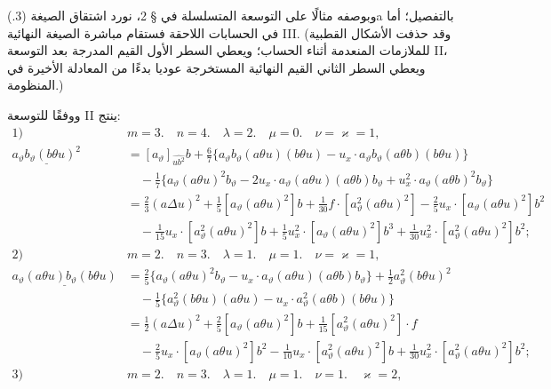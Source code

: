 \documentclass[11pt]{article}
\providecommand{\A}{\Delta}
\begin{document}
وبوصفه مثالًا على التوسعة المتسلسلة في § 2، نورد اشتقاق الصيغة (3.)a بالتفصيل؛ أما في الحسابات اللاحقة فستقام مباشرة الصيغة النهائية III. (وقد حذفت الأشكال القطبية للملازمات المنعدمة أثناء الحساب؛ ويعطي السطر الأول القيم المدرجة بعد التوسعة II، ويعطي السطر الثاني القيم النهائية المستخرجة عوديا بدءًا من المعادلة الأخيرة في المنظومة.)

ووفقًا للتوسعة II ينتج:
\[
\begin{aligned}
\text{1)}\quad&m=3.\quad n=4.\quad \lambda=2.\quad \mu=0.\quad \nu=\varkappa=1,\\[0.25em]
\underline{a_\vartheta b_\vartheta(b\theta u)^2}
&=[a_\vartheta]_{\widehat{ub^2}}b+\frac67\{a_\vartheta b_\vartheta(a\theta u)(b\theta u)-u_x\cdot a_\vartheta b_\vartheta(a\theta b)(b\theta u)\}\\
&\quad-\frac17\{a_\vartheta(a\theta u)^2b_\vartheta-2u_x\cdot a_\vartheta(a\theta u)(a\theta b)b_\vartheta+u_x^2\cdot a_\vartheta(a\theta b)^2b_\vartheta\}\\
&=\frac23(a\A u)^2+\frac15[a_\vartheta(a\theta u)^2]b+\frac1{30}f\cdot[a_\vartheta^2(a\theta u)^2]-\frac25u_x\cdot[a_\vartheta(a\theta u)^2]b^2\\
&\quad-\frac1{15}u_x\cdot[a_\vartheta^2(a\theta u)^2]b+\frac15u_x^2\cdot[a_\vartheta(a\theta u)^2]b^3+\frac1{30}u_x^2\cdot[a_\vartheta^2(a\theta u)^2]b^2;\\[0.7em]
\text{2)}\quad&m=2.\quad n=3.\quad \lambda=1.\quad \mu=1.\quad \nu=\varkappa=1,\\[0.25em]
\underline{a_\vartheta(a\theta u)b_\vartheta(b\theta u)}
&=\frac25\{a_\vartheta(a\theta u)^2b_\vartheta-u_x\cdot a_\vartheta(a\theta u)(a\theta b)b_\vartheta\}+\frac12a_\vartheta^2(b\theta u)^2\\
&\quad-\frac15\{a_\vartheta^2(b\theta u)(a\theta u)-u_x\cdot a_\vartheta^2(a\theta b)(b\theta u)\}\\
&=\frac12(a\A u)^2+\frac25[a_\vartheta(a\theta u)^2]b+\frac1{15}[a_\vartheta^2(a\theta u)^2]\cdot f\\
&\quad-\frac25u_x\cdot[a_\vartheta(a\theta u)^2]b^2-\frac1{10}u_x\cdot[a_\vartheta^2(a\theta u)^2]b+\frac1{30}u_x^2\cdot[a_\vartheta^2(a\theta u)^2]b^2;\\[0.7em]
\text{3)}\quad&m=2.\quad n=3.\quad \lambda=1.\quad \mu=1.\quad \nu=1.\quad \varkappa=2,
\end{aligned}
\]
\end{document}
